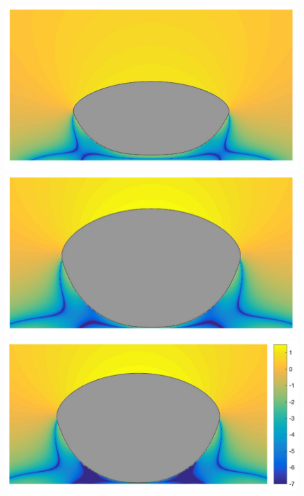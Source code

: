 \documentclass[preprint, 10pt]{elsarticle}
\begin{document}
\begin{figure}[H]
\begin{center}
\includegraphics[width = 0.30 \textwidth]{./figs/1b_0d4r1h_vort}
\includegraphics[width = 0.30 \textwidth]{./figs/1b_0d4r0d5h_vort}
\includegraphics[width = 0.33 \textwidth]{./figs/1b_0d4r0d1h_vort}
\caption{\label{fig:NearWall_vort} }
\end{center}
\end{figure}
\end{document}
